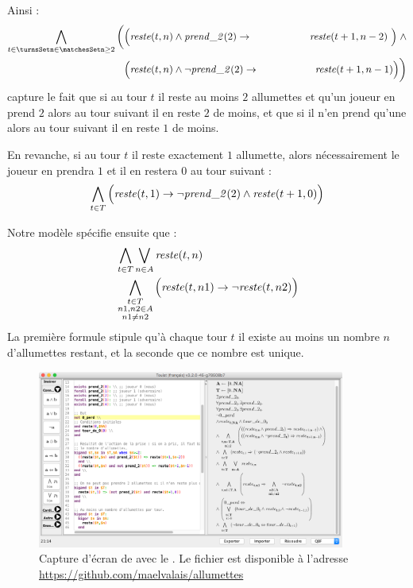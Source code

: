 Ainsi :
\begin{align}
\bigwedge_{\substack{t \in \turnsSet%
n \in \matchesSet%
n \geq 2}}
    \bigg ( & \Big ( \rest{t}{n} \land \takes{t} \limp%
    & \hspace{1.5cm}\rest{t+1}{n-2} \ \Big ) \; \land \\
    & \Big ( \rest{t}{n} \land \neg \takes{t} \limp %
    & \hspace{1.5cm}\rest{t+1}{n-1} \Big ) \bigg )
\end{align}
capture le fait que si au tour $t$ il reste au moins $2$ allumettes et qu'un joueur en prend $2$ alors au tour suivant il en reste $2$ de moins, et que si il n'en prend qu'une alors au tour suivant il en reste $1$ de moins.

En revanche, si au tour $t$ il reste exactement $1$ allumette, alors nécessairement le joueur en prendra $1$ et il en restera $0$ au tour suivant :
\begin{gather}
\bigwedge_{t \in T}
    \Big (\mathit{reste}(t, 1) \rightarrow \neg \mathit{prend\_2}(2) \land \mathit{reste}(t+1, 0)\Big )
\end{gather}

Notre modèle spécifie ensuite que :
\begin{align}
& \bigwedge_{t \in T}
    \bigvee_{n \in A}
        \mathit{reste}(t, n) \\
& \bigwedge_{\substack{t \in T\\ n1, n2 \in A\\ n1 \neq n2}}
    \Big ( \mathit{reste}(t, n1) \rightarrow \neg\mathit{reste}(t, n2) \Big )
\end{align}
La première formule stipule qu'à chaque tour $t$ il existe au moins un nombre $n$ d'allumettes restant, et la seconde que ce nombre est unique.

\begin{figure}
\centering
\includegraphics[width=0.9\textwidth]{figures/touistScreenshot}
\caption{Capture d'écran de \touist avec le \game. Le fichier est disponible à l'adresse \url{https://github.com/maelvalais/allumettes}}
\label{fig:touistScreenshot}
\end{figure}

